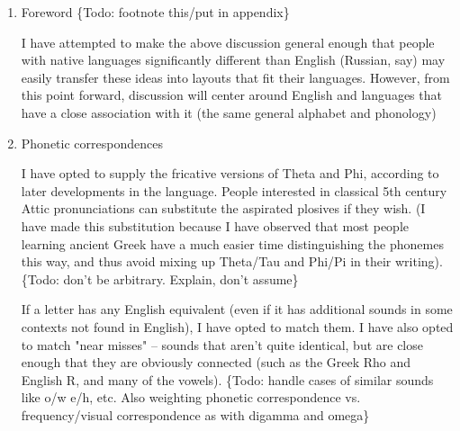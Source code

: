 \documentclass[11pt]{article}
\begin{document}
\begin{enumerate}
\item Foreword \{Todo: footnote this/put in appendix\}
\label{sec:orgefc912a}

I have attempted to make the above discussion general enough that people with native languages significantly different than English (Russian, say) may easily transfer these ideas into layouts that fit their languages. However, from this point forward, discussion will center around English and languages that have a close association with it (the same general alphabet and phonology)

\item Phonetic correspondences
\label{sec:orga755e62}

I have opted to supply the fricative versions of Theta and Phi, according to later developments in the language. People interested in classical 5th century Attic pronunciations can substitute the aspirated plosives if they wish. (I have made this substitution because I have observed that most people learning ancient Greek have a much easier time distinguishing the phonemes this way, and thus avoid mixing up Theta/Tau and Phi/Pi in their writing). \{Todo: don't be arbitrary. Explain, don't assume\}

If a letter has any English equivalent (even if it has additional sounds in some contexts not found in English), I have opted to match them. I have also opted to match "near misses" -- sounds that aren't quite identical, but are close enough that they are obviously connected (such as the Greek Rho and English R, and many of the vowels). \{Todo: handle cases of similar sounds like o/w e/h, etc. Also weighting phonetic correspondence vs. frequency/visual correspondence as with digamma and omega\}


\end{enumerate}
\end{document}
